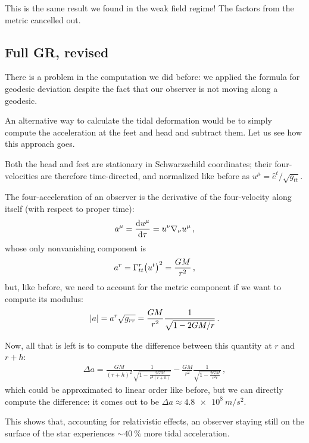 \documentclass[main.tex]{subfiles}
\begin{document}
This is the same result we found in the weak field regime! 
The factors from the metric cancelled out.

\subsection{Full GR, revised}

There is a problem in the computation we did before: we applied the formula for geodesic deviation despite the fact that our observer is not moving along a geodesic. 

An alternative way to calculate the tidal deformation would be to simply compute the acceleration at the feet and head and subtract them. 
Let us see how this approach goes. 

Both the head and feet are stationary in Schwarzschild coordinates; their four-velocities are therefore time-directed, and normalized like before as \(u^{\mu } = \hat{e}^{t} / \sqrt{g_{tt}}\).

The four-acceleration of an observer is the derivative of the four-velocity along itself (with respect to proper time): 
%
\begin{align}
a^{\mu } = \dv{u^{\mu }}{\tau } = u^{\nu } \nabla_{\nu } u^{\mu } 
\,,
\end{align}
%
whose only nonvanishing component is 
%
\begin{align}
a^{r} = \Gamma^{r}_{tt} \qty( u^{t})^2 = \frac{GM}{r^2}
\,,
\end{align}
%
but, like before, we need to account for the metric component if we want to compute its modulus: 
%
\begin{align}
\abs{a} = a^{r} \sqrt{ g_{rr}} = \frac{GM}{r^2} \frac{1}{\sqrt{1 - 2GM / r}}
\,.
\end{align}

Now, all that is left is to compute the difference between this quantity at \(r\) and \(r + h\): 
%
\begin{align}
\Delta a = 
\frac{GM}{(r + h)^2} \frac{1}{\sqrt{1- \frac{2GM}{c^2(r+h)}}}
- 
\frac{GM}{r^2} \frac{1}{\sqrt{1- \frac{2GM}{c^2r}}}
\,,
\end{align}
%
which could be approximated to linear order like before, 
but we can directly compute the difference: 
it comes out to be \(\Delta a \approx \SI{4.8e8}{m / s^2}\). 

This shows that, accounting for relativistic effects, 
an observer staying still on the surface of the star experiences \(\sim \SI{40}{\percent}\) more tidal acceleration.
\end{document}
